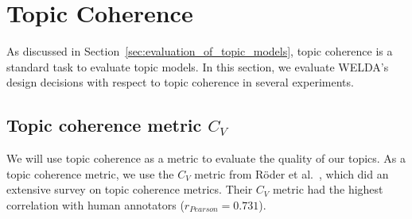 \documentclass[
        a4paper,
        titlepage,
        twoside,
        parskip
        ]{scrbook}
\theoremstyle{break}
\begin{document}
\section{Topic Coherence}
\label{sec:topic_coherence}
As discussed in Section~\ref{sec:evaluation_of_topic_models}, topic coherence is a standard task to evaluate topic models.
In this section, we evaluate WELDA's design decisions with respect to topic coherence in several experiments.
\subsection{Topic coherence metric $C_V$}

We will use topic coherence as a metric to evaluate the quality of our topics.
As a topic coherence metric, we use the $C_V$ metric from Röder et al.~\cite{Roder2015}, which did an extensive survey on topic coherence metrics.
Their $C_V$ metric had the highest correlation with human annotators ($r_{Pearson} = 0.731$).
\end{document}
